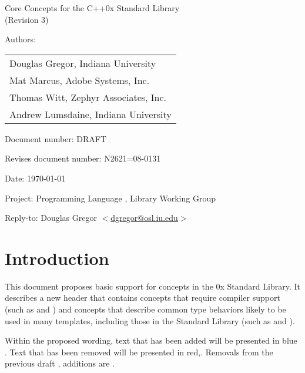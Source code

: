 \documentclass[american,twoside]{book}
\begin{document}
\raggedbottom

\begin{titlepage}
\begin{center}
\huge
Core Concepts for the C++0x Standard Library\\
(Revision 3)
\vspace{0.25in}
\end{center}

\normalsize
\vspace{0.25in}
\par\noindent Authors: 
\begin{tabular}[t]{l}
Douglas Gregor, Indiana University \\
Mat Marcus, Adobe Systems, Inc.\\
Thomas Witt, Zephyr Associates, Inc.\\
Andrew Lumsdaine, Indiana University
\end{tabular}\vspace{-6pt}

\par\noindent Document number: DRAFT\vspace{-6pt}
\par\noindent Revises document number: N2621=08-0131\vspace{-6pt}
\par\noindent Date: \today\vspace{-6pt}
\par\noindent Project: Programming Language \Cpp{}, Library Working Group\vspace{-6pt}
\par\noindent Reply-to: Douglas Gregor $<$\href{mailto:dgregor@osl.iu.edu}{dgregor@osl.iu.edu}$>$\vspace{-6pt}

\section*{Introduction}
This document proposes basic support for concepts in the \Cpp0x
Standard Library. It describes a new header  that
contains concepts that require compiler support (such as
 and ) and concepts that describe
common type behaviors likely to be used in many templates, including
those in the Standard Library (such as  and
). 

Within the proposed wording, text that has been added
\textcolor{addclr}{will be presented in blue} . Text that has been removed will be
presented \textcolor{remclr}{in red},. Removals from the previous draft
, additions are
.


\end{titlepage}
\end{document}
